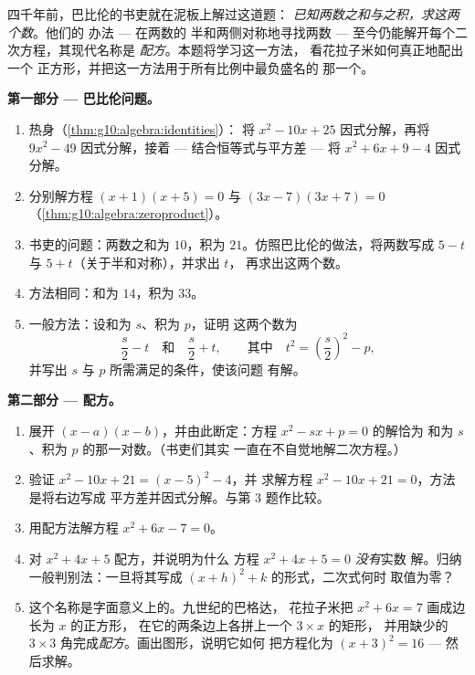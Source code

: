 \begin{problem}[{周末问题 --- 和积问题，
以花拉子米的作图方式配方，以及
方程 $x^2 = x + 1$}]
\label{pb:g10:algebra:1}
       四千年前，巴比伦的书吏就在泥板上解过这道题：
       \emph{已知两数之和与之积，求这两个数}。他们的
       办法 --- 在两数的
       半和两侧对称地寻找两数 --- 至今仍能解开每个二次方程，其现代名称是
       \emph{配方}。本题将学习这一方法，
       看花拉子米如何真正地配出一个
       正方形，并把这一方法用于所有比例中最负盛名的
       那一个。

\medskip
\noindent\textbf{第一部分 --- 巴比伦问题。}
\begin{enumerate}
  \item 热身（\cref{thm:g10:algebra:identities}）：
        将 $x^2 - 10x + 25$ 因式分解，再将 $9x^2 - 49$ 因式分解，接着 ---
        结合恒等式与平方差 --- 将
        $x^2 + 6x + 9 - 4$ 因式分解。
  \item 分别解方程 $(x + 1)(x + 5) = 0$ 与
        $(3x - 7)(3x + 7) = 0$
        （\cref{thm:g10:algebra:zeroproduct}）。
  \item 书吏的问题：两数之和为 $10$，积为
        $21$。仿照巴比伦的做法，将两数写成 $5 - t$
        与 $5 + t$（关于半和对称），并求出 $t$，
        再求出这两个数。
  \item 方法相同：和为 $14$，积为 $33$。
  \item 一般方法：设和为 $s$、积为 $p$，证明
        这两个数为
        \[
        \frac s2 - t
        \quad\text{和}\quad
        \frac s2 + t,
        \qquad\text{其中}\quad
        t^2 = \left(\frac s2\right)^2 - p ,
        \]
        并写出 $s$ 与 $p$ 所需满足的条件，使该问题
        有解。
\end{enumerate}

\medskip
\noindent\textbf{第二部分 --- 配方。}
\begin{enumerate}[resume]
  \item 展开 $(x - a)(x - b)$，并由此断定：方程
        $x^2 - sx + p = 0$ 的解恰为
        和为 $s$、积为 $p$ 的那一对数。（书吏们其实
        一直在不自觉地解二次方程。）
  \item 验证 $x^2 - 10x + 21 = (x - 5)^2 - 4$，并
        求解方程 $x^2 - 10x + 21 = 0$，方法是将右边写成
        平方差并因式分解。与第 3 题作比较。
  \item 用配方法解方程 $x^2 + 6x - 7 = 0$。
  \item 对 $x^2 + 4x + 5$ 配方，并说明为什么
        方程 $x^2 + 4x + 5 = 0$ \emph{没有}实数
        解。归纳一般判别法：一旦将其写成
        $(x + h)^2 + k$ 的形式，二次式何时
        取值为零？
  \item 这个名称是字面意义上的。九世纪的巴格达，
        花拉子米把 $x^2 + 6x = 7$ 画成边长为 $x$ 的正方形，
        在它的两条边上各拼上一个 $3 \times x$ 的矩形，
        并用缺少的
        $3 \times 3$ 角完成\emph{配方}。画出图形，说明它如何
        把方程化为 $(x + 3)^2 = 16$ --- 然后求解。
\end{enumerate}


\end{problem}
